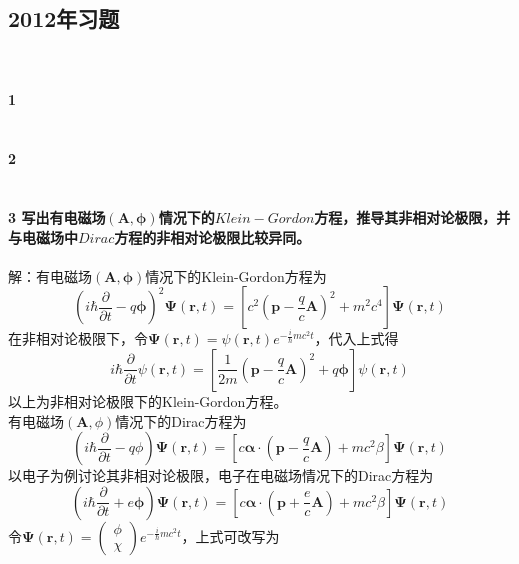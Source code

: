 \documentclass[12pt]{article}
\numberwithin{equation}{section}	 %
\begin{document}
\begin{spacing}{1.5}
\subsection{2012年习题}
~\\
~\\
\textbf{1 \quad }\\
~\\
~\\
\textbf{2 \quad }\\
~\\
~\\
\textbf{3 \quad 写出有电磁场$\left(\bm{A},\bm\phi\right)$情况下的$Klein-Gordon$方程，推导其非相对论极限，并与电磁场中$Dirac$方程的非相对论极限比较异同。}\\
~\\
解：有电磁场$\left(\bm{A},\bm\phi\right)$情况下的Klein-Gordon方程为
\begin{equation}
\left(i\hbar\frac{\partial}{\partial t}-q\bm\phi\right)^{2} \bm\Psi\left(\bm{r},t\right) = \left[c^{2}\left(\bm{p}-\frac{q}{c}\bm{A}\right)^{2}+m^{2}c^{4}\right] \bm\Psi\left(\bm{r},t\right)
\end{equation}
在非相对论极限下，令$\displaystyle \bm\Psi\left(\bm{r},t\right) = \psi\left(\bm{r},t\right)e^{-\frac{i}{\hbar}mc^{2}t}$，代入上式得
\begin{equation}
i\hbar\frac{\partial}{\partial t}\psi\left(\bm{r},t\right) = \left[\frac{1}{2m}\left( \bm{p}-\frac{q}{c}\bm{A} \right)^{2}+q\bm\phi\right]\psi\left(\bm{r},t\right)
\end{equation}
以上为非相对论极限下的Klein-Gordon方程。
~\\
有电磁场$\left(\bm{A},\phi\right)$情况下的Dirac方程为
\begin{equation}
\left(i\hbar\frac{\partial}{\partial t}-q\phi\right) \bm\Psi\left(\bm{r},t\right) = \left[c\bm\alpha\cdot\left(\bm{p}-\frac{q}{c}\bm{A}\right)+mc^{2}\beta\right] \bm\Psi\left(\bm{r},t\right)
\end{equation}
以电子为例讨论其非相对论极限，电子在电磁场情况下的Dirac方程为
\begin{equation}\nonumber 		%
\left(i\hbar\frac{\partial}{\partial t}+e\bm\phi\right) \bm\Psi\left(\bm{r},t\right) = \left[c\bm\alpha\cdot\left(\bm{p}+\frac{e}{c}\bm{A}\right)+mc^{2}\beta\right] \bm\Psi\left(\bm{r},t\right)
\end{equation}
令$\displaystyle \bm\Psi\left(\bm{r},t\right) = \begin{pmatrix} \phi \\ \chi \end{pmatrix}e^{-\frac{i}{\hbar}mc^{2}t}$，上式可改写为

\end{spacing}
\end{document}
